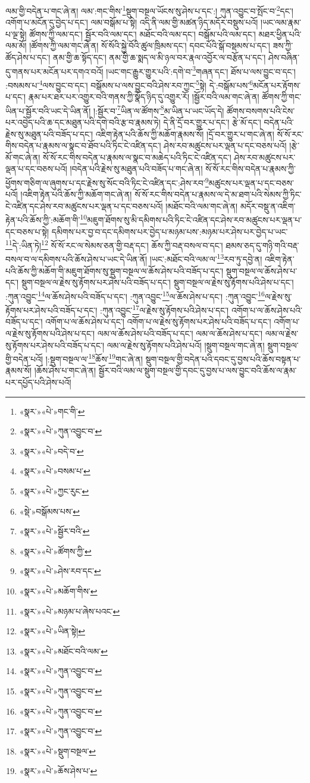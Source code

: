 ལམ་གྱི་བདེན་པ་གང་ཞེ་ན། ལམ་:གང་གིས་\footnote{«སྣར་»«པེ་»གང་གི་}སྡུག་བསྔལ་ཡོངས་སུ་ཤེས་པ་དང་:། ཀུན་འབྱུང་བ་སྤོང་བ་\footnote{«སྣར་»«པེ་»ཀུན་འབྱུང་བ་}དང་། འགོག་པ་མངོན་དུ་བྱེད་པ་དང་། ལམ་བསྒོམ་པ་སྟེ། འདི་ནི་ལམ་གྱི་མཚན་ཉིད་མདོར་བསྡུས་པའོ། །ཡང་ལམ་རྣམ་པ་ལྔ་སྟེ། ཚོགས་ཀྱི་ལམ་དང་། སྦྱོར་བའི་ལམ་དང་། མཐོང་བའི་ལམ་དང་། བསྒོམ་པའི་ལམ་དང་། མཐར་ཕྱིན་པའི་ལམ་མོ། །ཚོགས་ཀྱི་ལམ་གང་ཞེ་ན། སོ་སོའི་སྐྱེ་བོའི་ཚུལ་ཁྲིམས་དང་། དབང་པོའི་སྒོ་བསྡམས་པ་དང་། ཟས་ཀྱི་ཚོད་ཤེས་པ་དང་། ནམ་གྱི་ཆ་སྟོད་དང་། ནམ་གྱི་ཆ་སྨད་ལ་མི་ཉལ་བར་རྣལ་འབྱོར་ལ་བརྩོན་པ་དང་། ཤེས་བཞིན་དུ་གནས་པར་མངོན་པར་དགའ་བའོ། །ཡང་གང་རྒྱུར་གྱུར་པའི་:དགེ་བ་\footnote{«སྣར་»«པེ་»བདེ་བ་}གཞན་དང་། ཐོས་པ་ལས་བྱུང་བ་དང་། :བསམས་པ་\footnote{«སྣར་»«པེ་»བསམ་པ་}ལས་བྱུང་བ་དང་། བསྒོམས་པ་ལས་བྱུང་བའི་ཤེས་རབ་ཀྱང་\footnote{«སྣར་»«པེ་»ཀྱང་རུང་}སྟེ། དེ་:བསྒོམ་པས་\footnote{«སྡེ་»བསྒོམས་པས་}མངོན་པར་རྟོགས་པ་དང་། རྣམ་པར་ཐར་པར་འགྱུར་བའི་གནས་ཀྱི་སྣོད་ཉིད་དུ་འགྱུར་རོ། །སྦྱོར་བའི་ལམ་གང་ཞེ་ན། ཚོགས་ཀྱི་གང་ཡིན་པ་སྦྱོར་བའི་ཡང་དེ་ཡིན་ནོ། །:སྦྱོར་བ་\footnote{«སྣར་»«པེ་»སྦྱོར་བའི་}ཡིན་ལ་ཚོགས་\footnote{«སྣར་»«པེ་»ཚོགས་ཀྱི་}མ་ཡིན་པ་ཡང་ཡོད་དེ། ཚོགས་བསགས་པའི་ངེས་པར་འབྱེད་པའི་ཆ་དང་མཐུན་པའི་དགེ་བའི་རྩ་བ་རྣམས་ཏེ། དེ་ནི་དྲོ་བར་གྱུར་པ་དང་། རྩེ་མོ་དང་། བདེན་པའི་རྗེས་སུ་མཐུན་པའི་བཟོད་པ་དང་། འཇིག་རྟེན་པའི་ཆོས་ཀྱི་མཆོག་རྣམས་སོ། །དྲོ་བར་གྱུར་པ་གང་ཞེ་ན། སོ་སོ་རང་གིས་བདེན་པ་རྣམས་ལ་སྣང་བ་ཐོབ་པའི་ཏིང་ངེ་འཛིན་དང་། ཤེས་རབ་མཚུངས་པར་ལྡན་པ་དང་བཅས་པའོ། །རྩེ་མོ་གང་ཞེ་ན། སོ་སོ་རང་གིས་བདེན་པ་རྣམས་ལ་སྣང་བ་མཆེད་པའི་ཏིང་ངེ་འཛིན་དང་། ཤེས་རབ་མཚུངས་པར་ལྡན་པ་དང་བཅས་པའོ། །བདེན་པའི་རྗེས་སུ་མཐུན་པའི་བཟོད་པ་གང་ཞེ་ན། སོ་སོ་རང་གིས་བདེན་པ་རྣམས་ཀྱི་ཕྱོགས་གཅིག་ལ་ཞུགས་པ་དང་རྗེས་སུ་སོང་བའི་ཏིང་ངེ་འཛིན་དང་:ཤེས་རབ་\footnote{«སྣར་»«པེ་»ཤེས་རབ་དང་}མཚུངས་པར་ལྡན་པ་དང་བཅས་པའོ། །འཇིག་རྟེན་པའི་ཆོས་ཀྱི་མཆོག་གང་ཞེ་ན། སོ་སོ་རང་གིས་བདེན་པ་རྣམས་ལ་དེ་མ་ཐག་པའི་སེམས་ཀྱི་ཏིང་ངེ་འཛིན་དང་ཤེས་རབ་མཚུངས་པར་ལྡན་པ་དང་བཅས་པའོ། །མཐོང་བའི་ལམ་གང་ཞེ་ན། མདོར་བསྡུ་ན་འཇིག་རྟེན་པའི་ཆོས་ཀྱི་:མཆོག་གི་\footnote{«སྣར་»«པེ་»མཆོག་གིས་}མཇུག་ཐོགས་སུ་མི་དམིགས་པའི་ཏིང་ངེ་འཛིན་དང་ཤེས་རབ་མཚུངས་པར་ལྡན་པ་དང་བཅས་པ་སྟེ། དམིགས་པར་བྱ་བ་དང་དམིགས་པར་བྱེད་པ་མཉམ་པས་:མཉམ་པར་ཤེས་པར་བྱེད་པ་ཡང་\footnote{«སྣར་»«པེ་»མཉམ་པ་ཞེས་པའང་}དེ་:ཡིན་ཏེ།\footnote{«སྣར་»«པེ་»ཡིན་སྟེ།} སོ་སོ་རང་ལ་སེམས་ཅན་གྱི་བརྡ་དང་། ཆོས་ཀྱི་བརྡ་བསལ་བ་དང་། ཐམས་ཅད་དུ་གཉི་གའི་བརྡ་བསལ་བ་ལ་དམིགས་པའི་ཆོས་ཤེས་པ་ཡང་དེ་ཡིན་ནོ། །ཡང་:མཐོང་བའི་ལམ་ལ་\footnote{«སྣར་»«པེ་»མཐོང་བའི་ལམ་}རབ་ཏུ་དབྱེ་ན། འཇིག་རྟེན་པའི་ཆོས་ཀྱི་མཆོག་གི་མཇུག་ཐོགས་སུ་སྡུག་བསྔལ་ལ་ཆོས་ཤེས་པའི་བཟོད་པ་དང་། སྡུག་བསྔལ་ལ་ཆོས་ཤེས་པ་དང་། སྡུག་བསྔལ་ལ་རྗེས་སུ་རྟོགས་པར་ཤེས་པའི་བཟོད་པ་དང་། སྡུག་བསྔལ་ལ་རྗེས་སུ་རྟོགས་པའི་ཤེས་པ་དང་། :ཀུན་འབྱུང་\footnote{«སྣར་»«པེ་»ཀུན་འབྱུང་བ་}ལ་ཆོས་ཤེས་པའི་བཟོད་པ་དང་། :ཀུན་འབྱུང་\footnote{«སྣར་»«པེ་»ཀུན་འབྱུང་བ་}ལ་ཆོས་ཤེས་པ་དང་། :ཀུན་འབྱུང་\footnote{«སྣར་»«པེ་»ཀུན་འབྱུང་བ་}ལ་རྗེས་སུ་རྟོགས་པར་ཤེས་པའི་བཟོད་པ་དང་། :ཀུན་འབྱུང་\footnote{«སྣར་»«པེ་»ཀུན་འབྱུང་བ་}ལ་རྗེས་སུ་རྟོགས་པའི་ཤེས་པ་དང་། འགོག་པ་ལ་ཆོས་ཤེས་པའི་བཟོད་པ་དང་། འགོག་པ་ལ་ཆོས་ཤེས་པ་དང་། འགོག་པ་ལ་རྗེས་སུ་རྟོགས་པར་ཤེས་པའི་བཟོད་པ་དང་། འགོག་པ་ལ་རྗེས་སུ་རྟོགས་པའི་ཤེས་པ་དང་། ལམ་ལ་ཆོས་ཤེས་པའི་བཟོད་པ་དང་། ལམ་ལ་ཆོས་ཤེས་པ་དང་། ལམ་ལ་རྗེས་སུ་རྟོགས་པར་ཤེས་པའི་བཟོད་པ་དང་། ལམ་ལ་རྗེས་སུ་རྟོགས་པའི་ཤེས་པའོ། །སྡུག་བསྔལ་གང་ཞེ་ན། སྡུག་བསྔལ་གྱི་བདེན་པའོ། །:སྡུག་བསྔལ་ལ་\footnote{«སྣར་»«པེ་»སྡུག་བསྔལ་}ཆོས་\footnote{«སྣར་»«པེ་»ཆོས་ཤེས་པ་}གང་ཞེ་ན། སྡུག་བསྔལ་གྱི་བདེན་པའི་དབང་དུ་བྱས་པའི་ཆོས་བསྟན་པ་རྣམས་སོ། །ཆོས་ཤེས་པ་གང་ཞེ་ན། སྦྱོར་བའི་ལམ་ལ་སྡུག་བསྔལ་གྱི་དབང་དུ་བྱས་པ་ལས་བྱུང་བའི་ཆོས་ལ་རྣམ་པར་དཔྱོད་པའི་ཤེས་པའོ། 